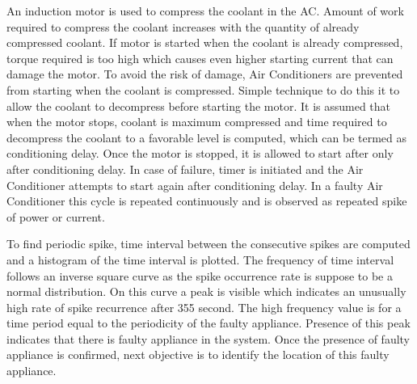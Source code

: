 An induction motor is used to compress the coolant in the AC. Amount of work required to compress the coolant increases with the quantity of already compressed coolant. If motor is started when the coolant is already compressed, torque required is too high which causes even higher starting current that can damage the motor. To avoid the risk of damage, Air Conditioners are prevented from starting when the coolant is compressed. Simple technique to do this it to allow the coolant to decompress before starting the motor. It is assumed that when the motor stops, coolant is maximum compressed and time required to decompress the coolant to a favorable level is computed, which can be termed as conditioning delay. Once the motor is stopped, it is allowed to start after only after conditioning delay. In case of failure, timer is initiated and the Air Conditioner attempts to start again after conditioning delay. In a faulty Air Conditioner this cycle is repeated continuously and is observed as repeated spike of power or current.

To find periodic spike, time interval between the consecutive spikes are computed and a histogram of the time interval is plotted. The frequency of time interval follows an inverse square curve as the spike occurrence rate is suppose to be a normal distribution. On this curve a peak is visible which indicates an unusually high rate of spike recurrence after 355 second. The high frequency value is for a time period equal to the periodicity of the faulty appliance. Presence of this peak indicates that there is faulty appliance in the system. Once the presence of faulty appliance is confirmed, next objective is to identify the location of this faulty appliance.


